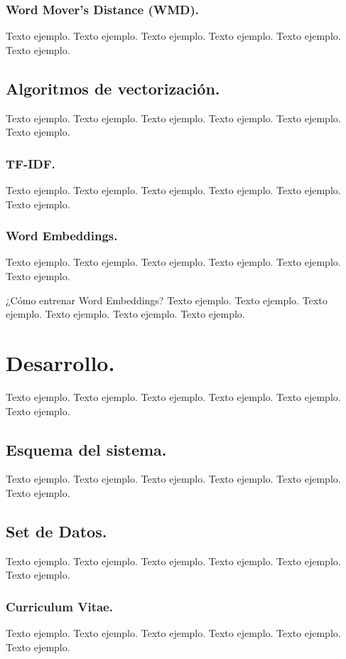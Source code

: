 \documentclass[12pt,a4paper]{article}
\makeatletter
\renewcommand\paragraph{\@startsection{paragraph}{4}{\z@}
            {-2.5ex\@plus -1ex \@minus -.25ex}
            {1.25ex \@plus .25ex}
            {\normalfont\normalsize\bfseries}}
\makeatother
\begin{document}
\subsubsection{Word Mover's Distance (WMD).}
Texto ejemplo. Texto ejemplo. Texto ejemplo. Texto ejemplo. Texto ejemplo. Texto ejemplo.

\subsection{Algoritmos de vectorización.}
Texto ejemplo. Texto ejemplo. Texto ejemplo. Texto ejemplo. Texto ejemplo. Texto ejemplo.

\subsubsection{TF-IDF.}
Texto ejemplo. Texto ejemplo. Texto ejemplo. Texto ejemplo. Texto ejemplo. Texto ejemplo.

\subsubsection{Word Embeddings.}
Texto ejemplo. Texto ejemplo. Texto ejemplo. Texto ejemplo. Texto ejemplo. Texto ejemplo.

\paragraph{¿Cómo entrenar Word Embeddings?}
Texto ejemplo. Texto ejemplo. Texto ejemplo. Texto ejemplo. Texto ejemplo. Texto ejemplo.

\section{Desarrollo.}
Texto ejemplo. Texto ejemplo. Texto ejemplo. Texto ejemplo. Texto ejemplo. Texto ejemplo.

\subsection{Esquema del sistema.}
Texto ejemplo. Texto ejemplo. Texto ejemplo. Texto ejemplo. Texto ejemplo. Texto ejemplo.

\subsection{Set de Datos.}
Texto ejemplo. Texto ejemplo. Texto ejemplo. Texto ejemplo. Texto ejemplo. Texto ejemplo.

\subsubsection{Curriculum Vitae.}
Texto ejemplo. Texto ejemplo. Texto ejemplo. Texto ejemplo. Texto ejemplo. Texto ejemplo.
\end{document}

